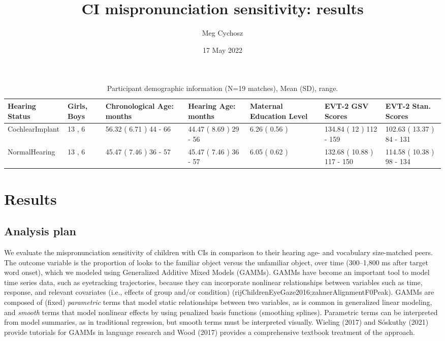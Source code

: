 \documentclass[
]{article}
\title{CI mispronunciation sensitivity: results}
\author{Meg Cychosz}
\date{17 May 2022}
\begin{document}
\maketitle

\begin{table}[!h]

\caption{\label{tab:demo-tab}Participant demographic information (N=19 matches), Mean (SD), range.}
\centering
\begin{tabular}[t]{lllllll}
\toprule
Hearing Status & Girls, Boys & Chronological Age: months & Hearing Age: months & Maternal Education Level & EVT-2 GSV Scores & EVT-2 Stan. Scores\\
\midrule
CochlearImplant & 13 , 6 & 56.32 ( 6.71 ) 44 - 66 & 44.47 ( 8.69 ) 29 - 56 & 6.26 ( 0.56 ) & 134.84 ( 12 ) 112 - 159 & 102.63 ( 13.37 ) 84 - 131\\
NormalHearing & 13 , 6 & 45.47 ( 7.46 ) 36 - 57 & 45.47 ( 7.46 ) 36 - 57 & 6.05 ( 0.62 ) & 132.68 ( 10.88 ) 117 - 150 & 114.58 ( 10.38 ) 98 - 134\\
\bottomrule
\end{tabular}
\end{table}

\hypertarget{results}{%
\section{Results}\label{results}}

\hypertarget{analysis-plan}{%
\subsection{Analysis plan}\label{analysis-plan}}

We evaluate the mispronunciation sensitivity of children with CIs in comparison to their hearing age- and vocabulary size-matched peers. The outcome variable is the proportion of looks to the familiar object versus the unfamiliar object, over time (300--1,800 ms after target word onset), which we modeled using Generalized Additive Mixed Models (GAMMs). GAMMs have become an important tool to model time series data, such as eyetracking trajectories, because they can incorporate nonlinear relationships between variables such as time, response, and relevant covariates (i.e., effects of group and/or condition) (rijChildrenEyeGaze2016;zahnerAlignmentF0Peak). GAMMs are composed of (fixed) \emph{parametric} terms that model static relationships between two variables, as is common in generalized linear modeling, and \emph{smooth} terms that model nonlinear effects by using penalized basis functions (smoothing splines). Parametric terms can be interpreted from model summaries, as in traditional regression, but smooth terms must be interpreted visually. Wieling (2017) and Sóskuthy (2021) provide tutorials for GAMMs in language research and Wood (2017) provides a comprehensive textbook treatment of the approach.
\end{document}
